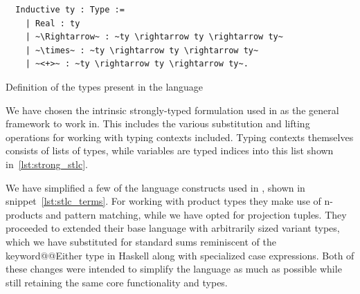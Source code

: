 \documentclass[12pt, final]{article}
\makeatletter
\def\<#1>{\csname keyword@@#1\endcsname}
\makeatother
\begin{document}
\begin{listing}
  \begin{verbatim}
  Inductive ty : Type :=
    | Real : ty
    | ~\Rightarrow~ : ~ty \rightarrow ty \rightarrow ty~
    | ~\times~ : ~ty \rightarrow ty \rightarrow ty~
    | ~<+>~ : ~ty \rightarrow ty \rightarrow ty~.
  \end{verbatim}
  \caption{Definition of the types present in the language}
  \label{lst:stlc_types}
\end{listing}

We have chosen the intrinsic strongly-typed formulation used in \cite{Benton2011} as the general framework to work in. This includes the various substitution and lifting operations for working with typing contexts included. Typing contexts themselves consists of lists of types, while variables are typed indices into this list shown in~\ref{lst:strong_stlc}.

We have simplified a few of the language constructs used in \cite{huot2020correctness}, shown in snippet~\ref{lst:stlc_terms}. For working with product types they make use of n-products and pattern matching, while we have opted for projection tuples. They proceeded to extended their base language with arbitrarily sized variant types, which we have substituted for standard sums reminiscent of the \<Either> type in Haskell along with specialized case expressions. Both of these changes were intended to simplify the language as much as possible while still retaining the same core functionality and types.
\end{document}
